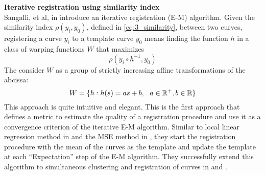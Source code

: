 \noindent
{\bf{Iterative registration using similarity index}} \\
Sangalli, et al, in \cite{Sangalli_etal_2009_JASA} introduce an iterative registration (E-M) algorithm. Given the similarity index $\rho(y_i, y_0)$, defined in \ref{eq:3_similarity}, between two curves, registering a curve $y_i$ to a template curve $y_0$ means finding the function $h$ in a class of warping functions $W$ that maximizes 
\[ \rho(y_i \circ h^{-1}, y_0)\]
The consider $W$ as a group of strictly increasing affine transformations of the abcissa:
\begin{equation}
W = \{h:h(s) = as + b,\ \ a \in \mathbb{R}^{+}, b \in \mathbb{R}  \}
\label{eq:3_affine}
\end{equation}
This approach is quite intuitive and elegant. This is the first approach that defines a metric to estimate the quality of a registration procedure and use it as a convergence criterion of the iterative E-M algorithm. Similar to local linear regression method in \cite{Kneip_etal_2000_CJS} and the MSE method in \cite{Ramsay_2006_Functional}, they start the registration procedure with the mean of the curves as the template and update the template at each ``Expectation'' step of the E-M algorithm. They successfully extend this algorithm to simultaneous clustering and registration of curves in \cite{Sangalli_etal_2010_CSDA} and \cite{Sangalli_etal_2014_EJS}. 

